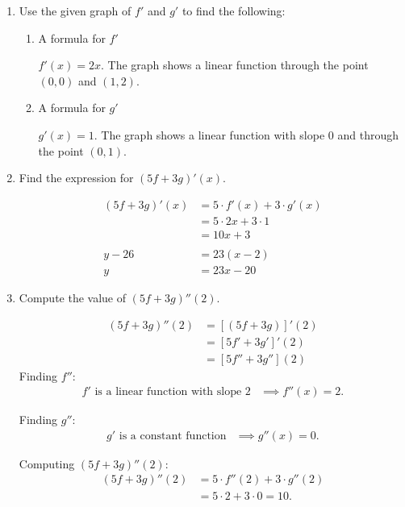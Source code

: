 \documentclass[nooutcomes]{ximera}
\begin{document}
\begin{problem}
\begin{enumerate}
	\item Use the given graph of $f'$ and $g'$ to find the following:
	\begin{enumerate}
		\item A formula for $f'$
			\begin{freeResponse}
				$f'(x)=2x$.  The graph shows a linear function through the point $(0,0)$ and $(1,2)$.
			\end{freeResponse}
	
		\item A formula for $g'$
			\begin{freeResponse}
				$g'(x)=1$.  The graph shows a linear function with slope $0$ and through the point $(0,1)$.
			\end{freeResponse}
	\end{enumerate}

	\item Find the expression for $(5f+3g)'(x)$.
	
	\begin{freeResponse}
         \begin{align*}
           (5f+3g)'(x) &= 5\cdot f'(x) + 3 \cdot g'(x)\\
                       &= 5 \cdot 2x + 3 \cdot 1 \\
                       &= 10x+3\\\\
	y-26 &=23(x-2)\\
	y&=23x-20
         \end{align*}
	\end{freeResponse}

     \item
       Compute the value of $(5f+3g)''(2)$.
       \begin{freeResponse}
         \begin{align*}
		(5f+3g)''(2)&=[(5f+3g)]'(2)\\
		&=[5f'+3g']'(2)\\
		&=[5f''+3g''](2)
	\end{align*}
	Finding $f''$:
         \begin{align*}
           \mbox{$f'$ is a linear function with slope 2} &\implies f''(x) = 2.
         \end{align*}

         Finding $g''$:
         \begin{align*}
           \mbox{$g'$ is a constant function} &\implies g''(x) = 0.
         \end{align*}
         
         Computing $(5f+3g)''(2)$:
         \begin{align*}
           (5f+3g)''(2) &= 5\cdot f''(2) + 3 \cdot g''(2) \\
                        &= 5 \cdot 2 + 3 \cdot 0 = 10.
         \end{align*}
       \end{freeResponse}


   \end{enumerate}

\end{problem}
\end{document}
